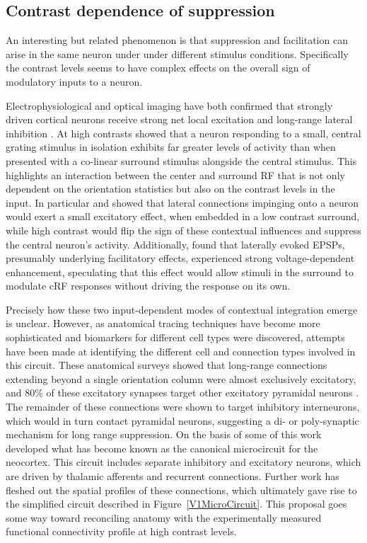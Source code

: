 \subsection{Contrast dependence of suppression}

An interesting but related phenomenon is that suppression and
facilitation can arise in the same neuron under under different
stimulus conditions. Specifically the contrast levels seems to have
complex effects on the overall sign of modulatory inputs to a neuron.

Electrophysiological and optical imaging have both confirmed that
strongly driven cortical neurons receive strong net local excitation and
long-range lateral inhibition \citep{Grinvald1994,Sceniak2001}. At
high contrasts \cite{Grinvald1994} showed that a neuron responding to
a small, central grating stimulus in isolation exhibits far greater
levels of activity than when presented with a co-linear surround
stimulus alongside the central stimulus. This highlights an
interaction between the center and surround RF that is not only
dependent on the orientation statistics but also on the contrast
levels in the input. In particular \cite{Hirsch1991} and
\cite{Weliky1995} showed that lateral connections impinging onto a
neuron would exert a small excitatory effect, when embedded in a low
contrast surround, while high contrast would flip the sign of these
contextual influences and suppress the central neuron's
activity. Additionally, \cite{Hirsch1991} found that laterally evoked
EPSPs, presumably underlying facilitatory effects, experienced strong
voltage-dependent enhancement, speculating that this effect would allow
stimuli in the surround to modulate cRF responses without driving the
response on its own.

Precisely how these two input-dependent modes of contextual
integration emerge is unclear. However, as anatomical tracing
techniques have become more sophisticated and biomarkers for different
cell types were discovered, attempts have been made at identifying the
different cell and connection types involved in this circuit. These
anatomical surveys showed that long-range connections extending beyond
a single orientation column were almost exclusively excitatory, and
80\% of these excitatory synapses target other excitatory pyramidal
neurons \citep{Hirsch1991,Kisvarday1997a}. The remainder of these
connections were shown to target inhibitory interneurons, which would
in turn contact pyramidal neurons, suggesting a di- or poly-synaptic
mechanism for long range suppression. On the basis of some of this
work \cite{Douglas1991} developed what has become known as the
canonical microcircuit for the neocortex. This circuit includes
separate inhibitory and excitatory neurons, which are driven by
thalamic afferents and recurrent connections. Further work has fleshed
out the spatial profiles of these connections, which ultimately gave
rise to the simplified circuit described in
Figure~\ref{V1MicroCircuit}. This proposal goes some way toward
reconciling anatomy with the experimentally measured functional
connectivity profile at high contrast levels.


